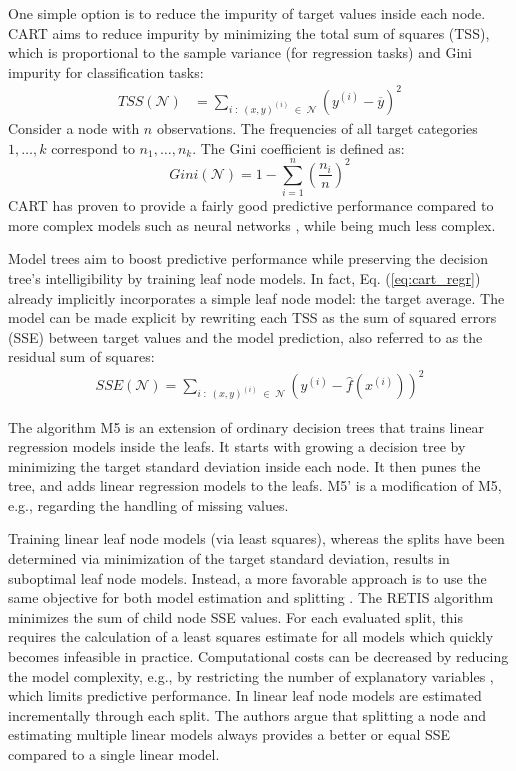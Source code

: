 \documentclass[a4paper, 11pt]{article}
\newcommand{\Node}{\mathcal{N}}
\begin{document}
\par 
One simple option is to reduce the impurity of target values inside each node. CART aims to reduce impurity by minimizing the total sum of squares (TSS), which is proportional to the sample variance (for regression tasks) and Gini impurity for classification tasks:
\begin{align}
TSS(\Node) &= \sum_{i \;:\; (x, y)^{(i)} \;\in\; \Node} \left(y^{(i)} - \overline{y}\right)^2
\label{eq:cart_regr}
\end{align}
Consider a node with $n$ observations. The frequencies of all target categories $1, \dots, k$ correspond to $n_1, \dots, n_k$. The Gini coefficient is defined as:
$$
Gini(\Node) = 1 - \sum_{i = 1}^n \left(\frac{n_i}{n}\right)^2
$$
CART has proven to provide a fairly good predictive performance compared to more complex models such as neural networks \cite{razi_cart_comparison}, while being much less complex.
\par
Model trees aim to boost predictive performance while preserving the decision tree's intelligibility by training leaf node models. In fact, Eq. (\ref{eq:cart_regr}) already implicitly incorporates a simple leaf node model: the target average. The model can be made explicit by rewriting each TSS as the sum of squared errors (SSE) between target values and the model prediction, also referred to as the residual sum of squares:
\begin{align*}
SSE(\Node) = \sum_{i \;:\; (x, y)^{(i)} \;\in\; \Node} \left(y^{(i)} - \widehat{f}(x^{(i)})\right)^2
\end{align*}
\par
The algorithm M5 \cite{quinlan_model_tree} is an extension of ordinary decision trees that trains linear regression models inside the leafs. It starts with growing a decision tree by minimizing the target standard deviation inside each node. It then punes the tree, and adds linear regression models to the leafs. M5' \cite{wang_m5} is a modification of M5, e.g., regarding the handling of missing values.
\par
Training linear leaf node models (via least squares), whereas the splits have been determined via minimization of the target standard deviation, results in suboptimal leaf node models. Instead, a more favorable approach is to use the same objective for both model estimation and splitting \cite{zeileis_mob}. The RETIS algorithm \cite{karalic_retis} minimizes the sum of child node SSE values. For each evaluated split, this requires the calculation of a least squares estimate for all models which quickly becomes infeasible in practice. Computational costs can be decreased by reducing the model complexity, e.g., by restricting the number of explanatory variables \cite{grimshaw_treed}, which limits predictive performance. In \cite{potts_incremental_model_tree} linear leaf node models are estimated incrementally through each split. The authors argue that splitting a node and estimating multiple linear models always provides a better or equal SSE compared to a single linear model.
\end{document}
